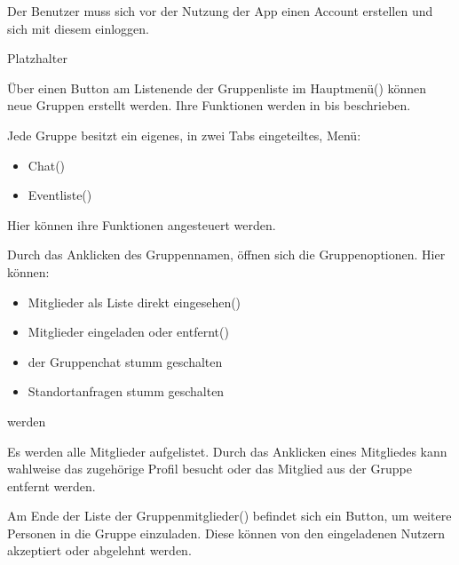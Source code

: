 \documentclass[parskip=full,11pt]{scrartcl}
\begin{document}
Der Benutzer muss sich vor der Nutzung der App einen Account erstellen und sich mit diesem einloggen.

Platzhalter %

Über einen Button am Listenende der Gruppenliste im Hauptmenü() können neue Gruppen
erstellt werden. Ihre Funktionen werden in  bis 
beschrieben.

Jede Gruppe besitzt ein eigenes, in zwei Tabs eingeteiltes, Menü:
\begin{itemize}
		\item Chat()
		\item Eventliste()
\end{itemize}
Hier können ihre Funktionen angesteuert werden.

Durch das Anklicken des Gruppennamen, öffnen sich die Gruppenoptionen. Hier können:
\begin{itemize}
		\item Mitglieder als Liste direkt eingesehen()
		\item Mitglieder eingeladen oder entfernt()
		\item der Gruppenchat stumm geschalten %
		\item Standortanfragen stumm geschalten %
\end{itemize}
werden

Es werden alle Mitglieder aufgelistet. Durch das Anklicken eines Mitgliedes kann wahlweise das
zugehörige Profil besucht oder das Mitglied aus der Gruppe entfernt werden.

Am Ende der Liste der Gruppenmitglieder() befindet sich ein Button,
um weitere Personen in die Gruppe einzuladen. Diese können von den eingeladenen Nutzern akzeptiert
oder abgelehnt werden.
\end{document}
